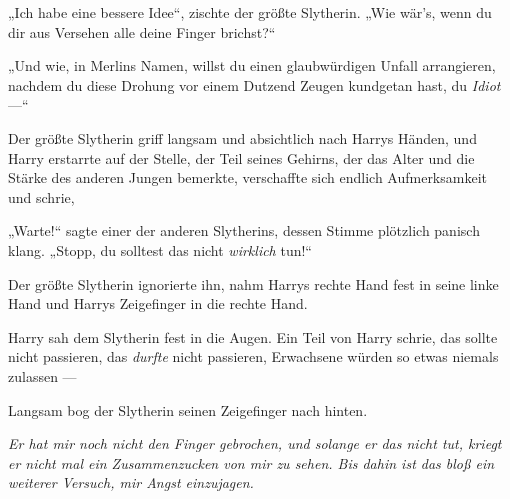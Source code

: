 „Ich habe eine bessere Idee“, zischte der größte Slytherin.
„Wie wär’s, wenn du dir aus Versehen alle deine Finger brichst?“

„Und wie, in Merlins Namen, willst du einen glaubwürdigen Unfall arrangieren, nachdem du diese Drohung vor einem Dutzend Zeugen kundgetan hast, du \emph{Idiot} —“

Der größte Slytherin griff langsam und absichtlich nach Harrys Händen, und Harry erstarrte auf der Stelle, der Teil seines Gehirns, der das Alter und die Stärke des anderen Jungen bemerkte, verschaffte sich endlich Aufmerksamkeit und schrie, 

„Warte!“ sagte einer der anderen Slytherins, dessen Stimme plötzlich panisch klang.
„Stopp, du solltest das nicht \emph{wirklich} tun!“

Der größte Slytherin ignorierte ihn, nahm Harrys rechte Hand fest in seine linke Hand und Harrys Zeigefinger in die rechte Hand.

Harry sah dem Slytherin fest in die Augen. Ein Teil von Harry schrie, das sollte nicht passieren, das \emph{durfte} nicht passieren, Erwachsene würden so etwas niemals zulassen —

Langsam bog der Slytherin seinen Zeigefinger nach hinten.

\emph{Er hat mir noch nicht den Finger gebrochen, und solange er das nicht tut, kriegt er nicht mal ein Zusammenzucken von mir zu sehen. Bis dahin ist das bloß ein weiterer Versuch, mir Angst einzujagen.}

